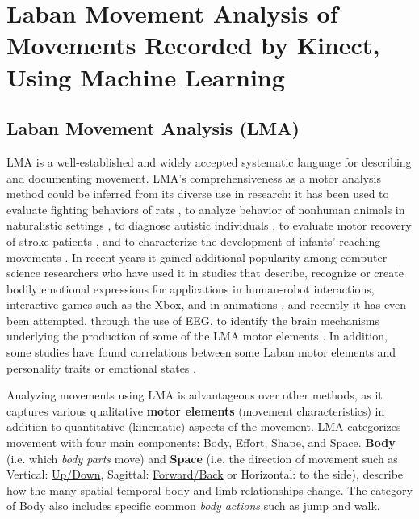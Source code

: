 
\chapter{Laban Movement Analysis of Movements Recorded by Kinect, Using Machine Learning}
\label{chap:firstchap}

\section{Laban Movement Analysis (LMA)}
LMA is a well-established and widely accepted systematic language for describing
and documenting movement. LMA's comprehensiveness as a motor analysis method
could be inferred from its diverse use in research: it has been used to evaluate
fighting behaviors of rats \cite{foroud2003development}, to analyze behavior of
nonhuman animals in naturalistic settings \cite{fagan1997observing}, to diagnose
autistic individuals \cite{dott1995aesthetic}, to evaluate motor recovery of
stroke patients \cite{foroud2006changes}, and to characterize the development of
infants' reaching movements \cite{foroud2012consummatory}. In recent years it
gained additional popularity among computer science researchers who have used it
in studies that describe, recognize or create bodily emotional expressions for
applications in human-robot interactions, interactive games such as the Xbox,
and in animations \cite{camurri2003recognizing,rett,
Zacharatos, lourens2010communicating, zhao2005acquiring,masuda2009emotion,
masuda2010motion}, and recently it has even been attempted, through the use of
EEG, to identify the brain mechanisms underlying the production of some of the
LMA motor elements \cite{cruz2014neural}. In addition, some studies have found
correlations between some Laban motor elements and personality traits or
emotional states \cite{levy2003use, shafir2015emotion}.
\par Analyzing movements using LMA is advantageous over other methods, as it
captures various qualitative \textbf{motor elements} (movement characteristics)
in addition to quantitative (kinematic) aspects of the movement. LMA categorizes
movement with four main components: Body, Effort, Shape, and Space.
\textbf{Body} (i.e. which \textit{body parts} move) and \textbf{Space} (i.e. the
direction of movement such as Vertical:
\underline{Up/Down}, Sagittal: \underline{Forward/Back} or Horizontal: to the
side), describe how the many spatial-temporal body and limb relationships
change. The category of Body also
includes specific common \textit{body actions} such as jump and walk.
